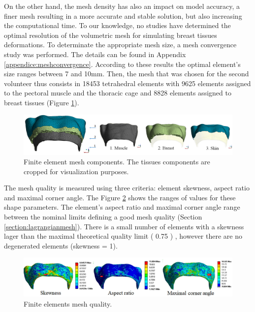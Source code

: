  On the other hand, the mesh density has also an impact on model accuracy, a finer mesh resulting in a more accurate and stable solution, but also increasing the computational time. To our knowledge, no studies have determined the optimal resolution of the volumetric mesh for simulating breast tissues deformations. To determinate the appropriate mesh size, a mesh convergence study was performed. The details can be found in Appendix \ref{appendice:meshconvergence}.  According to these results the optimal element’s size ranges between 7 and 10mm. Then, the mesh that was chosen for the second volunteer thus consists in 18453 tetrahedral elements with 9625 elements assigned to the pectoral muscle and the thoracic cage and 8828 elements assigned to breast tissues (Figure \ref{fig:meshcomponents}).
 
 \begin{figure}[!h]
\centering
\includegraphics[width=1\textwidth,keepaspectratio]{figures/mesh3components.png} 
\caption{ Finite element mesh components. The tissues components are cropped for visualization purposes. }\label{fig:meshcomponents}
\end{figure}
 
 The mesh quality is measured using three criteria: element skewness, aspect ratio and maximal corner angle. The Figure \ref{fig:meshquality} shows the ranges of values for these shape parameters. The element's aspect ratio and maximal corner angle range between the nominal limits defining a good mesh quality (Section \ref{section:lagrangianmesh}). There is a small number of elements with a skewness lager than the maximal theoretical quality limit ( 0.75 ) , however there are no degenerated elements (skewness = 1).  

\begin{figure}[!h]
\centering
\includegraphics[width=1\textwidth,keepaspectratio]{figures/meshquality.jpg} 
\caption{ Finite elements mesh quality.}\label{fig:meshquality}
\end{figure}





